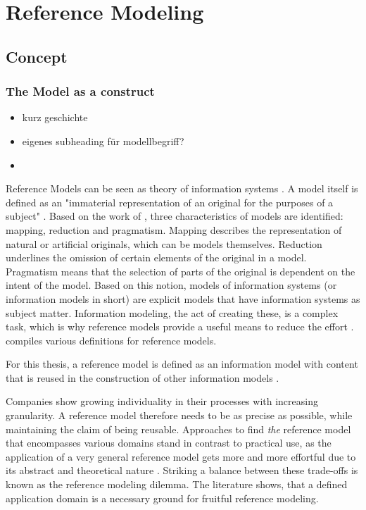 	\section{Reference Modeling}
		\subsection{Concept}
		
		\subsubsection{The Model as a construct}
		
		
		
		\begin{itemize}
			\item kurz geschichte
			\item eigenes subheading für modellbegriff?
			\item 
		\end{itemize}
		Reference Models can be seen as theory of information systems \cite{Schutte1998}. A model itself is defined as an "immaterial representation of an original for the purposes of a subject" \citep[]{Becker2012Gom}. Based on the work of \cite{Stachowiak1973}, three characteristics of models are identified: mapping, reduction and pragmatism.  Mapping describes the representation of natural or artificial originals, which can be models themselves. Reduction underlines the omission of certain elements of the original in a model. Pragmatism means that the selection of parts of the original is dependent on the intent of the model. Based on this notion, models of information systems (or information models in short) are explicit models that have information systems as subject matter. Information modeling, the act of creating these, is a complex task, which is why reference models provide a useful means to reduce the effort \cite{Becker2007}. \cite{thomas2006refmod} compiles various definitions for reference models. 
		
		For this thesis, a reference model is defined as an information model with content that is reused in the construction of other information models \cite{Becker2004}.
		
		Companies show growing individuality in their processes with increasing granularity. A reference model therefore needs to be as precise as possible, while maintaining the claim of being reusable. Approaches to find \textit{the} reference model that encompasses various domains stand in contrast to practical use, as the application of a very general reference model gets more and more effortful due to its abstract and theoretical nature \citep[]{Schutte1998}. Striking a balance between these trade-offs is known as the reference modeling dilemma. The literature shows, that a defined application domain is a necessary ground for fruitful reference modeling.
		
